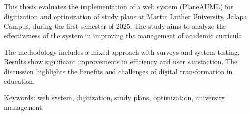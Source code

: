 

This thesis evaluates the implementation of a web system (PlaneAUML) for digitization and optimization of study plans at Martin Luther University, Jalapa Campus, during the first semester of 2025. The study aims to analyze the effectiveness of the system in improving the management of academic curricula.

The methodology includes a mixed approach with surveys and system testing. Results show significant improvements in efficiency and user satisfaction. The discussion highlights the benefits and challenges of digital transformation in education.

Keywords: web system, digitization, study plans, optimization, university management.